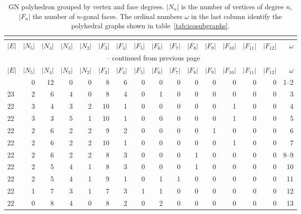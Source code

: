 \footnotesize{\begin{longtable}{l@{\hskip 4pt}r@{\hskip 4pt}r@{\hskip 4pt}r@{\hskip 4pt}r@{\hskip 4pt}r@{\hskip 4pt}r@{\hskip 4pt}r@{\hskip 4pt}r@{\hskip 4pt}r@{\hskip 4pt}r@{\hskip 4pt}r@{\hskip 4pt}r@{\hskip 4pt}r@{\hskip 4pt}r@{\hskip 8pt}r}
    \caption{GN polyhedron grouped by vertex and face degrees. $|N_n|$ is the
    number of vertices of degree $n$, $|F_n|$ the number of $n$-gonal faces.
    The ordinal numbers $\omega$ in the last column identify the polyhedral
    graphs shown in table~\ref{tab:icosubgraphs}.}\\
    \label{tab:verticesandfaces}\\
\toprule    
    $|E|$ & $|N_5|$ & $|N_4|$ & $|N_3|$ & $|N_2|$ & $|F_3|$ & $|F_4|$ & $|F_5|$ & $|F_6|$ & $|F_7|$ & $|F_8|$ & $|F_9|$ & $|F_{10}|$ & $|F_{11}|$ & $|F_{12}|$ & $\omega$ \\\midrule
\endfirsthead
\multicolumn{16}{c}{\tablename~\thetable{} -- continued from previous page}\\
\toprule
    $|E|$ & $|N_5|$ & $|N_4|$ & $|N_3|$ & $|N_2|$ & $|F_3|$ & $|F_4|$ & $|F_5|$ & $|F_6|$ & $|F_7|$ & $|F_8|$ & $|F_9|$ & $|F_{10}|$ & $|F_{11}|$ & $|F_{12}|$ & $\omega$ \\\midrule
\endhead
\bottomrule\endfoot
    24 & 0  & 12 & 0  & 0  & 8  & 6  & 0  & 0  & 0  & 0  & 0  & 0  & 0  & 0  & 1--2\\
    23 & 2  & 6  & 4  & 0  & 8  & 4  & 0  & 1  & 0  & 0  & 0  & 0  & 0  & 0  & 3  \\
    22 & 3  & 4  & 3  & 2  & 10 & 1  & 0  & 0  & 0  & 0  & 0  & 1  & 0  & 0  & 4  \\
    22 & 3  & 3  & 5  & 1  & 10 & 1  & 0  & 0  & 0  & 0  & 0  & 1  & 0  & 0  & 5  \\
    22 & 2  & 6  & 2  & 2  & 9  & 2  & 0  & 0  & 0  & 0  & 1  & 0  & 0  & 0  & 6  \\
    22 & 2  & 6  & 2  & 2  & 10 & 1  & 0  & 0  & 0  & 0  & 0  & 1  & 0  & 0  & 7  \\
    22 & 2  & 6  & 2  & 2  & 8  & 3  & 0  & 0  & 0  & 1  & 0  & 0  & 0  & 0  & 8--9\\
    22 & 2  & 5  & 4  & 1  & 8  & 3  & 0  & 0  & 0  & 1  & 0  & 0  & 0  & 0  & 10 \\
    22 & 2  & 5  & 4  & 1  & 9  & 1  & 0  & 1  & 1  & 0  & 0  & 0  & 0  & 0  & 11\\
    22 & 1  & 7  & 3  & 1  & 7  & 3  & 1  & 1  & 0  & 0  & 0  & 0  & 0  & 0  & 12 \\
    22 & 0  & 8  & 4  & 0  & 8  & 2  & 0  & 2  & 0  & 0  & 0  & 0  & 0  & 0  & 13\\

\end{longtable}}
